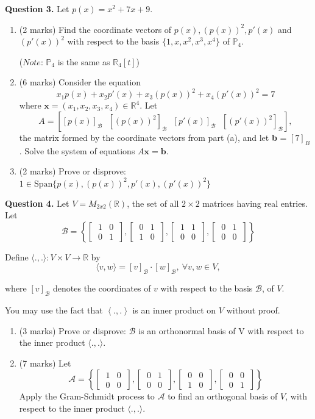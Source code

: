 \documentclass{article}
\newcommand{\R}{\mathbb{R}}
\newcommand{\Pol}{\mathbb{P}}
\newcommand{\twoxtwo}[4]{\begin{bmatrix}\ #1 & #2 \ \\ \ #3 & #4 \ \end{bmatrix}}
\begin{document}
\textbf{Question 3.}
Let $p(x) = x^2 + 7x + 9$.
\begin{enumerate}[label=(\alph*), leftmargin=6.25mm]
    \item (2 marks)
    Find the coordinate vectors of $p(x), (p(x))^2, p'(x)$ and $(p'(x))^2$ with respect to the basis $\{ 1, x, x^2, x^3, x^4 \}$ of $\Pol_4$.

    ($Note$: $\Pol_4$ is the same as $\R_4[t]$)

    \item (6 marks) Consider the equation
    $$x_1p(x) + x_2p'(x) + x_3(p(x))^2 + x_4(p'(x))^2 = 7$$
    where $\textbf{x} = (x_1, x_2, x_3, x_4) \in \R^4$. Let
    $$A = [[p(x)]_\mathcal{B} \ \ \ [(p(x))^2]_\mathcal{B} \ \ \ [p'(x)]_\mathcal{B} \ \ \ [(p'(x))^2]_\mathcal{B}],$$
    the matrix formed by the coordinate vectors from part (a), and let \textbf{b} = $[7]_B$. Solve the system of equations $A \textbf{x} = \textbf{b}$.

    \item (2 marks) Prove or disprove: $1 \in \text{Span}\{ p(x), (p(x))^2, p'(x), (p'(x))^2 \}$
\end{enumerate}


\textbf{Question 4.} Let $V = M_{2x2}(\R)$, the set of all $2 \times 2$ matrices having real entries. Let
$$\mathcal{B} = \left \{ \twoxtwo{1}{0}{0}{1}, \twoxtwo{0}{1}{1}{0}, \twoxtwo{1}{1}{0}{0}, \twoxtwo{0}{1}{0}{0} \right \}$$

Define $\langle .,. \rangle: V \times V \to \R$ by
$$\langle v, w \rangle = [v]_\mathcal{B} \cdot [w]_\mathcal{B}, \  \forall v, w \in V,$$

where $[v]_\mathcal{B}$ denotes the coordinates of $v$ with respect to the basis $\mathcal{B}$, of $V$.

You may use the fact that $\left\langle .,. \right\rangle$ is an inner product on $V$ without proof.

\begin{enumerate}[label=(\alph*), leftmargin=6.25mm]
    \item (3 marks)
    Prove or disprove: $\mathcal{B}$ is an orthonormal basis of V with respect to the inner product $\langle .,. \rangle$.

    \item (7 marks) Let
    $$\mathcal{A} = \left\{ \twoxtwo{1}{0}{0}{0}, \twoxtwo{0}{1}{0}{0}, \twoxtwo{0}{0}{1}{0}, \twoxtwo{0}{0}{0}{1} \right\}$$
    Apply the Gram-Schmidt process to $\mathcal{A}$ to find an orthogonal basis of $V$, with respect to the inner product $\langle .,. \rangle$.
\end{enumerate}
\end{document}

